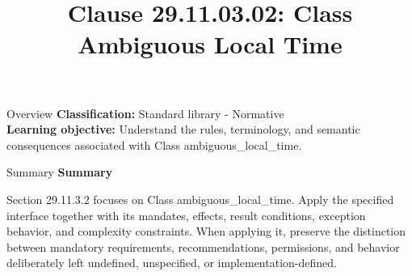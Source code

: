 \documentclass[10pt,letterpaper]{article}
\title{Clause 29.11.03.02: Class Ambiguous Local Time}
\author{}
\date{}
\begin{document}
\maketitle
\begin{CornellOverviewBox}{Overview}
\textbf{Classification:} Standard library - Normative\\[2pt]
\textbf{Learning objective:} Understand the rules, terminology, and semantic consequences associated with Class ambiguous\_local\_time.
\end{CornellOverviewBox}\begin{CornellSummaryBox}{Summary}
{\sffamily\bfseries\color{Accent} Summary}\par\vspace{3pt}Section 29.11.3.2 focuses on Class ambiguous\_local\_time. Apply the specified interface together with its mandates, effects, result conditions, exception behavior, and complexity constraints. When applying it, preserve the distinction between mandatory requirements, recommendations, permissions, and behavior deliberately left undefined, unspecified, or implementation-defined.
\end{CornellSummaryBox}
\end{document}
